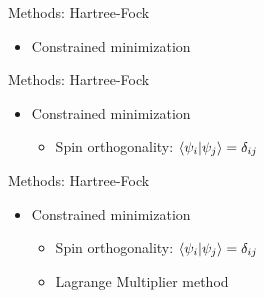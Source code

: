 \documentclass[10pt, t, xcolor=dvipsnames]{beamer}
\begin{document}
\begin{frame}[fragile]{Methods: Hartree-Fock}
    \begin{itemize}
        \item Constrained minimization
    \end{itemize}
\end{frame}

\begin{frame}[fragile]{Methods: Hartree-Fock}
    \begin{itemize}
        \item Constrained minimization
            \begin{itemize}
                \item Spin orthogonality: $\braket{\psi_i}{\psi_j} =
                    \delta_{ij}$
            \end{itemize}
    \end{itemize}
\end{frame}

\begin{frame}[fragile]{Methods: Hartree-Fock}
    \begin{itemize}
        \item Constrained minimization
            \begin{itemize}
                \item Spin orthogonality: $\braket{\psi_i}{\psi_j} =
                    \delta_{ij}$
                \item Lagrange Multiplier method
            \end{itemize}
    \end{itemize}
\end{frame}
\end{document}
